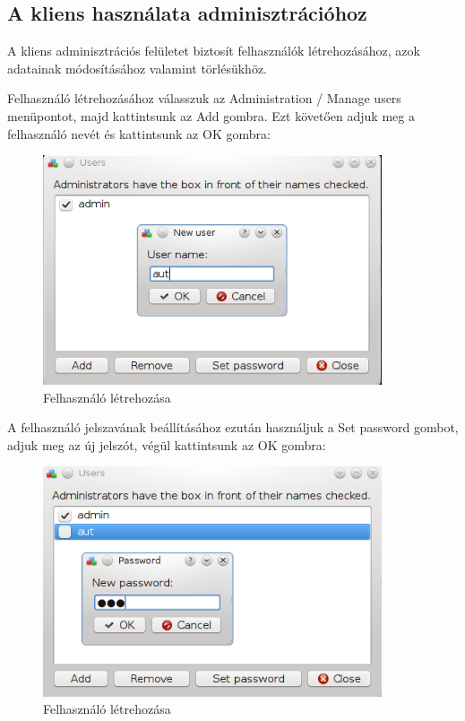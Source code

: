 \documentclass[a4paper,12pt]{article}
\begin{document}
\subsection{A kliens használata adminisztrációhoz}

A kliens adminisztrációs felületet biztosít felhasználók létrehozásához, azok
adatainak módosításához valamint törlésükhöz.

Felhasználó létrehozásához válasszuk az Administration / Manage users
menüpontot, majd kattintsunk az Add gombra. Ezt követően adjuk meg a
felhasználó nevét és kattintsunk az OK gombra:

\begin{figure}[H]
\centering
\includegraphics[width=100mm,keepaspectratio]{user-create.png}
\caption{Felhasználó létrehozása}
\end{figure}

A felhasználó jelszavának beállításához ezután használjuk a Set password
gombot, adjuk meg az új jelszót, végül kattintsunk az OK gombra:

\begin{figure}[H]
\centering
\includegraphics[width=100mm,keepaspectratio]{user-passwd.png}
\caption{Felhasználó létrehozása}
\end{figure}
\end{document}
